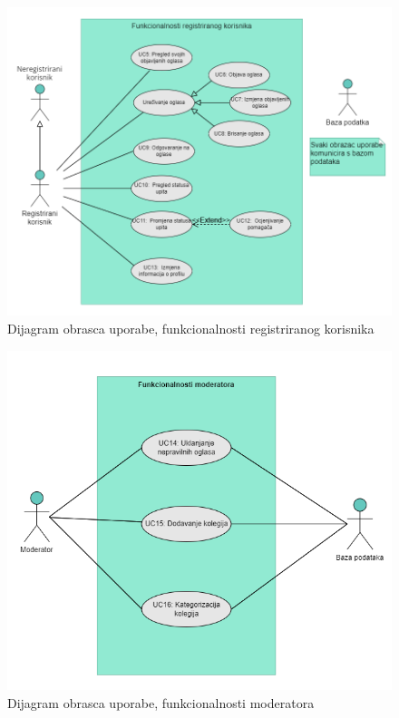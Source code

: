 					\begin{figure}[H]
						\includegraphics[scale=0.7]{dijagrami/UC_RegistriraniKorisnik.PNG}
						\centering
						\caption{Dijagram obrasca uporabe, funkcionalnosti registriranog korisnika}
						\label{fig:UC_RegistriranKorisnik}
					\end{figure}				
				
					\begin{figure}[H]
						\includegraphics[scale=0.9]{dijagrami/UC_Moderator.PNG}
						\centering
						\caption{Dijagram obrasca uporabe, funkcionalnosti moderatora}
						\label{fig:UC_Moderator}
					\end{figure}
					

